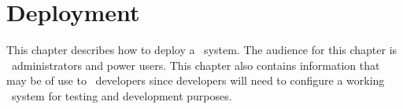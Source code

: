 %

\chapter{Deployment}
\label{deployment}

This chapter describes how to deploy a \VTank\ system. The audience for this chapter is \VTank\ administrators and power users. This chapter also contains information that may be of use to \VTank\ developers since developers will need to configure a working \VTank\ system for testing and development purposes.
